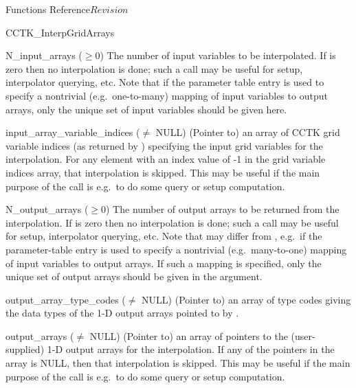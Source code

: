 \begin{cactuspart}{ Functions Reference}{}{$Revision$}
\begin{FunctionDescription}{CCTK\_InterpGridArrays}
\begin{ParameterSection}
\begin{Parameter}{N\_input\_arrays ($\ge 0$)}
The number of input variables to be interpolated.
If  is zero then no interpolation is done; such a call
may be useful for setup, interpolator querying, etc.
Note that if the parameter table entry  is used to specify
a nontrivial (e.g.\ one-to-many) mapping of input variables to output arrays,
only the
unique set of input variables should be given here.
\end{Parameter}
\begin{Parameter}{input\_array\_variable\_indices ($\ne$ NULL)}
(Pointer to) an array of  CCTK grid variable indices (as
returned by ) specifying the input grid variables for the
interpolation. For any element with an index value of -1 in the grid variable
indices array, that interpolation is skipped. This may be useful if the main
purpose of the call is e.g.\ to do some query or setup computation.
\end{Parameter}
\begin{Parameter}{N\_output\_arrays ($\ge 0$)}
The number of output arrays to be returned from the interpolation.
If  is zero then no interpolation is done; such a call
may be useful for setup, interpolator querying, etc.
Note that  may differ from , e.g.\
if the  parameter-table entry is used to specify a
nontrivial (e.g.\ many-to-one) mapping of input variables to output arrays.
If such a mapping is specified, only the unique set of output arrays
should be given in the \code{output\_arrays} argument.
\end{Parameter}
\begin{Parameter}{output\_array\_type\_codes ($\ne$ NULL)}
(Pointer to) an array of  
type codes giving the data types of the 1-D output arrays pointed to by
\code{output\_arrays[]}.
\end{Parameter}
\begin{Parameter}{output\_arrays ($\ne$ NULL)}
(Pointer to) an array of  pointers to the
(user-supplied) 1-D output arrays for the interpolation.
If any of the pointers in the  array is NULL, then that
interpolation is skipped. This may be useful if the main purpose of the call
is e.g.\ to do some query or setup computation.
\end{Parameter}
\end{ParameterSection}


\end{FunctionDescription}
\end{cactuspart}
